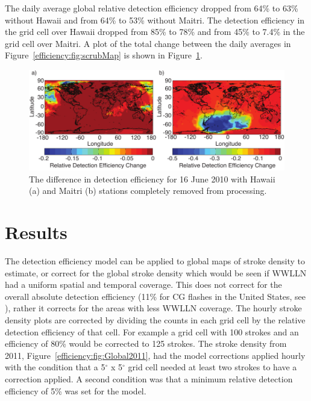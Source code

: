 The daily average global relative detection efficiency dropped from 64\% to 63\% without Hawaii and from 64\% to 53\% without Maitri.
The detection efficiency in the grid cell over Hawaii dropped from 85\% to 78\% and from 45\% to 7.4\% in the grid cell over Maitri.
A plot of the total change between the daily averages in Figure~\ref{efficiency:fig:scrubMap} is shown in Figure~\ref{efficiency:fig:scrub}.


\begin{figure}[ht!]
   \centering
\noindent\includegraphics[width=39pc]{efficiency/Figures/2012RS005049-p13.pdf}
\caption{The difference in detection efficiency for 16 June 2010 with Hawaii (a) and Maitri (b) stations completely removed from processing.}
\label{efficiency:fig:scrub}
\end{figure}

\section{Results}

The detection efficiency model can be applied to global maps of stroke density to estimate, or correct for the global stroke density which would be seen if WWLLN had a uniform spatial and temporal coverage.
This does not correct for the overall absolute detection efficiency (11\% for CG flashes in the United States, see \citet{Abarca2010}), rather it corrects for the areas with less WWLLN coverage.
The hourly stroke density plots are corrected by dividing the counts in each grid cell by the relative detection efficiency of that cell.
For example a grid cell with 100 strokes and an efficiency of 80\% would be corrected to 125 strokes.
The stroke density from 2011, Figure~\ref{efficiency:fig:Global2011}, had the model corrections applied hourly with the condition that a 5$^\circ$ x 5$^\circ$ grid cell needed at least two strokes to have a correction applied.
A second condition was that a minimum relative detection efficiency of 5\% was set for the model.



